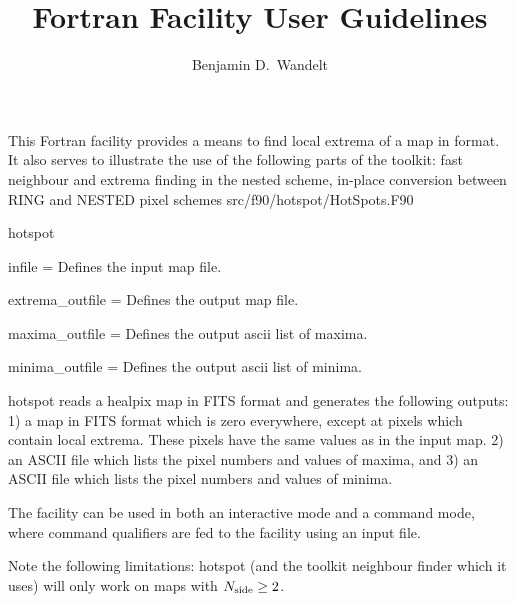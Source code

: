 
\sloppy


\title{\healpix Fortran Facility User Guidelines}
 \section[hotspot]{\nosectionname}
\label{fac:hotspot}
\author{Benjamin D.~Wandelt}

\begin{facility}
{This Fortran facility provides a means to find local extrema of
a map in \healpix format. It also serves to illustrate the use of the
following parts of the \healpix toolkit:
fast neighbour and extrema finding in the nested scheme,
in-place conversion between RING and NESTED pixel schemes } 
{src/f90/hotspot/HotSpots.F90}
\end{facility}

\begin{f90facility}
{hotspot}
\end{f90facility}

\begin{qualifiers}
  \begin{qulist}{} %
    \item[{infile = }]%
 Defines the input map file.
    \item[{extrema\_outfile = }]%
 Defines the output map file.
    \item[{maxima\_outfile = }]%
 Defines the output ascii list of maxima.
    \item[{minima\_outfile =  }]%
 Defines the output ascii list of minima.
  \end{qulist}
\end{qualifiers}

\begin{codedescription}
{
 hotspot reads a healpix map in FITS format and generates the following outputs: 
1) a \healpix map in FITS format which is zero everywhere, except at
 pixels which contain local extrema. These pixels have the same
 values as in the input map.
2) an ASCII file which lists the pixel numbers and values of
 maxima, and
3) an ASCII file which lists the pixel numbers and values of
 minima.

The facility can be used in both an interactive
mode and a command mode, where command qualifiers
are fed to the facility using an input file.

Note the following limitations:
hotspot (and the toolkit neighbour finder which it uses) will
only work on maps with $N_{\mathrm{side}}\ge 2$.
}
\end{codedescription}

